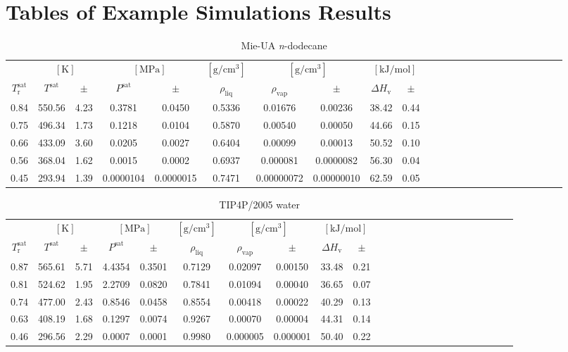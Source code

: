 \documentclass[%
 aip,
 jcp,
 sd,%
 amsmath,amssymb,
]{revtex4-1}
\begin{document}
\clearpage
\section{Tables of Example Simulations Results}
\begin{table*}[!htbp]
\centering
\caption{
Mie-UA \textit{n}-dodecane
}
\label{tab:Mie-C12-mie}
\begin{ruledtabular}
\begin{tabular}{cccccccccccccccccccccccc}
 & \multicolumn{2}{c}{$[\mathrm{K}]$} &	 \multicolumn{2}{c}{$[\mathrm{MPa}]$} & $[\mathrm{g/cm^3}]$ & \multicolumn{2}{c}{$[\mathrm{g/cm^3}]$} & \multicolumn{2}{c}{$[\mathrm{kJ/mol}]$} \\
$T_\mathrm{r}^{\mathrm{sat}}$ & $T^{\mathrm{sat}}$ & $\pm$ & $P^{\mathrm{sat}}$ & $\pm$ & $\rho_{\mathrm{liq}}$ & $\rho_{\mathrm{vap}}$ & $\pm$ & $\Delta H_{\mathrm{v}}$ & $\pm$
 \\
\hline		
0.84	&	550.56	&	4.23	&	0.3781	&	0.0450	&	0.5336	&	0.01676	&	0.00236	&	38.42	&	0.44	\\
0.75	&	496.34	&	1.73	&	0.1218	&	0.0104	&	0.5870	&	0.00540	&	0.00050	&	44.66	&	0.15	\\
0.66	&	433.09	&	3.60	&	0.0205	&	0.0027	&	0.6404	&	0.00099	&	0.00013	&	50.52	&	0.10	\\
0.56	&	368.04	&	1.62	&	0.0015	&	0.0002	&	0.6937	&	0.000081	&	0.0000082	&	56.30	&	0.04	\\
0.45	&	293.94	&	1.39	&	0.0000104	&	0.0000015	&	0.7471	&	0.00000072	&	0.00000010	&	62.59	&	0.05	\\
\end{tabular}
\end{ruledtabular}
\end{table*}


\begin{table*}[!htbp]
\centering
\caption{
TIP4P/2005 water
}
\label{tab:TIP4P2005-water-nistsim}
\begin{ruledtabular}
\begin{tabular}{cccccccccccccccccccccccc}
 & \multicolumn{2}{c}{$[\mathrm{K}]$} &	 \multicolumn{2}{c}{$[\mathrm{MPa}]$} & $[\mathrm{g/cm^3}]$ & \multicolumn{2}{c}{$[\mathrm{g/cm^3}]$} & \multicolumn{2}{c}{$[\mathrm{kJ/mol}]$} \\
$T_\mathrm{r}^{\mathrm{sat}}$ & $T^{\mathrm{sat}}$ & $\pm$ & $P^{\mathrm{sat}}$ & $\pm$ & $\rho_{\mathrm{liq}}$ & $\rho_{\mathrm{vap}}$ & $\pm$ & $\Delta H_{\mathrm{v}}$ & $\pm$
 \\
\hline		
0.87	&	565.61	&	5.71	&	4.4354	&	0.3501	&	0.7129	&	0.02097	&	0.00150	&	33.48	&	0.21	\\
0.81	&	524.62	&	1.95	&	2.2709	&	0.0820	&	0.7841	&	0.01094	&	0.00040	&	36.65	&	0.07	\\
0.74	&	477.00	&	2.43	&	0.8546	&	0.0458	&	0.8554	&	0.00418	&	0.00022	&	40.29	&	0.13	\\
0.63	&	408.19	&	1.68	&	0.1297	&	0.0074	&	0.9267	&	0.00070	&	0.00004	&	44.31	&	0.14	\\
0.46	&	296.56	&	2.29	&	0.0007	&	0.0001	&	0.9980	&	0.000005	&	0.000001	&	50.40	&	0.22	\\
\end{tabular}
\end{ruledtabular}
\end{table*}
\end{document}
